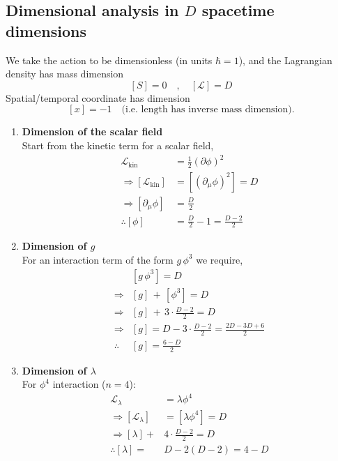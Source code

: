\documentclass[14pt]{article} %
\begin{document}
\subsection{Dimensional analysis in $D$ spacetime dimensions}
We take the action to be dimensionless (in units $\hbar = 1$), and the Lagrangian density has mass dimension
\[
[S]=0 \quad, \quad[\mathcal{L}] = D
\]
Spatial/temporal coordinate has dimension
\[
[x] = -1 \quad\text{(i.e. length has inverse mass dimension).}
\]
\begin{enumerate}
\item \textbf{Dimension of the scalar field}\\
\noindent
Start from the kinetic term for a scalar field,
\begin{align*}
\mathcal{L}_{\text{kin}} &= \tfrac12 (\partial \phi)^2
\\
\Rightarrow [\mathcal{L}_{\text{kin}}] &= [ (\partial_\mu \phi)^2 ] = D
\\
\Rightarrow [ \partial_\mu \phi ] &= \frac D2
\\
\therefore [ \phi ] &= \frac D2 -1 = \frac{D-2}{2}
\end{align*}
\item \textbf{Dimension of $g$}\\
\noindent
For an interaction term of the form $g\,\phi^3$ we require,
\begin{align*}
& [g\,\phi^3] = D
\\
\Rightarrow & [g]\,+\,[\phi^3] = D
\\
\Rightarrow & [g]\,+\,3\cdot \frac{D-2}{2} = D
\\
\Rightarrow & [g] = D - 3\cdot \frac{D-2}{2} = \frac{2D-3D+6}{2}
\\
\therefore ~& [g] = \frac{6-D}{2} 
\end{align*}

\item \textbf{Dimension of $\lambda$}\\
\noindent
For $\phi^4$ interaction ($n=4$):
\begin{align*}
\mathcal{L}_\lambda &= \lambda \phi^4
\\
\Rightarrow [\mathcal{L}_\lambda] &= [\lambda \phi^4] = D
\\
\Rightarrow [\lambda] +& 4\cdot \frac{D-2}{2} =  D
\\
\therefore [\lambda] = & D - 2(D-2) = 4-D 
\end{align*}
\end{enumerate}
\end{document}
